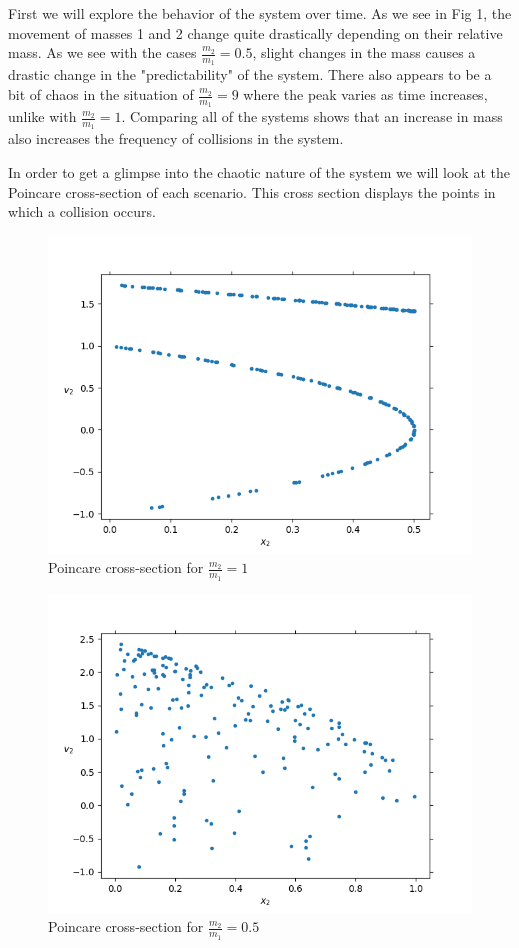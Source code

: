 \documentclass[pra,twocolumn,showpacs,amsmath,amssymb]{revtex4-2}
\begin{document}
First we will explore the behavior of the system over time. As we see in Fig 1, the movement of masses 1 and 2 change quite drastically depending on their relative mass. As we see with the cases \(\frac{m_2}{m_1} = 0.5\), slight changes in the mass causes a drastic change in the "predictability" of the system. There also appears to be a bit of chaos in the situation of \(\frac{m_2}{m_1} = 9\) where the peak varies as time increases, unlike with \(\frac{m_2}{m_1} = 1\). Comparing all of the systems shows that an increase in mass also increases the frequency of collisions in the system.
\par In order to get a glimpse into the chaotic nature of the system we will look at the Poincare cross-section of each scenario. This cross section displays the points in which a collision occurs.

\begin{figure}[t!]
\includegraphics[scale=0.50]{Poincare1.png}
\caption{Poincare cross-section for \(\frac{m_2}{m_1} = 1\)}\label{Poincare1}
\end{figure}

\begin{figure}[t!]
\includegraphics[scale=0.50]{Poincare0.5.png}
\caption{Poincare cross-section for \(\frac{m_2}{m_1} = 0.5\)}\label{Poincare0.5}
\end{figure}
\end{document}
